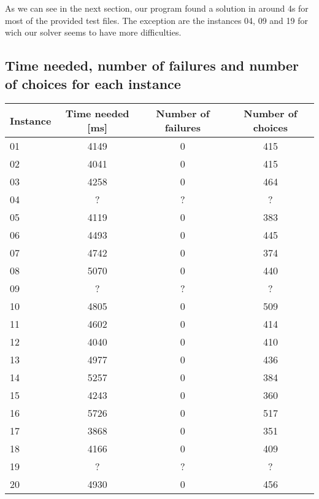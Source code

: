 \documentclass{eplDoc}
\begin{document}
As we can see in the next section, our program found a solution in around 4s for most of the provided test files. The exception are the instances 04, 09 and 19 for wich our solver seems to have more difficulties. \\ 


\subsection{Time needed, number of failures and number of choices for each instance}
\begin{center}
		\begin{tabular}{|l|c|c|c|}
			\hline
			Instance & Time needed [ms] & Number of failures & Number of choices \\ 
			\hline
			01 & 4149 & 0 & 415 \\ 
			02 & 4041 & 0 & 415 \\ 
			03 & 4258 & 0 & 464 \\ 
			04 & ? & ? & ? \\ 
			05 & 4119 & 0 & 383 \\ 
			06 & 4493 & 0 & 445 \\ 
			07 & 4742 & 0 & 374 \\ 
			08 & 5070 & 0 & 440 \\ 
			09 & ? & ? & ? \\ 
			10 & 4805 & 0 & 509 \\ 
			11 & 4602 & 0 & 414 \\ 
			12 & 4040 & 0 & 410 \\ 
			13 & 4977 & 0 & 436 \\ 
			14 & 5257 & 0 & 384 \\ 
			15 & 4243 & 0 & 360 \\ 
			16 & 5726 & 0 & 517 \\ 
			17 & 3868 & 0 & 351 \\ 
			18 & 4166 & 0 & 409 \\ 
			19 & ? & ? & ? \\ 
			20 & 4930 & 0 & 456 \\
			\hline
		\end{tabular}
\end{center}
\end{document}
